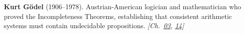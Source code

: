 \textbf{Kurt Gödel} (1906–1978). Austrian-American logician and mathematician who proved the Incompleteness Theorems, establishing that consistent arithmetic systems must contain undecidable propositions. \emph{[Ch.~\hyperref[ch:banach]{03}, \hyperref[ch:compacttwinparadox]{14}]}


